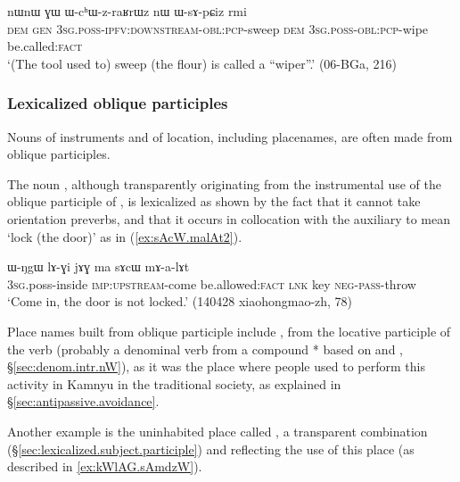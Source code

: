\begin{exe}
\ex \label{ex:WchWzraRWz}
\gll  nɯnɯ ɣɯ ɯ-cʰɯ-z-raʁrɯz nɯ ɯ-sɤ-pɕiz rmi \\ 
\textsc{dem} \textsc{gen} \textsc{3sg}.\textsc{poss}-\textsc{ipfv}:\textsc{downstream}-\textsc{obl}:\textsc{pcp}-sweep \textsc{dem}  \textsc{3sg}.\textsc{poss}-\textsc{obl}:\textsc{pcp}-wipe be.called:\textsc{fact} \\
\glt `(The tool used to) sweep (the flour) is called a ``wiper''.' (06-BGa, 216)
\end{exe}

\subsubsection{Lexicalized oblique participles} \label{sec:lexicalized.oblique.participle}
Nouns of instruments and of location, including placenames, are often made from oblique participles. 

The noun , although transparently originating from the instrumental use of the oblique participle of , is lexicalized as shown by the fact that it cannot take orientation preverbs, and that it occurs in collocation with the auxiliary  to mean `lock (the door)' as in (\ref{ex:sAcW.malAt2}).

\begin{exe}
\ex \label{ex:sAcW.malAt2}
\gll   ɯ-ŋgɯ lɤ-ɣi jɤɣ ma sɤcɯ mɤ-a-lɤt \\
\textsc{3sg}.poss-inside \textsc{imp}:\textsc{upstream}-come be.allowed:\textsc{fact} \textsc{lnk} key \textsc{neg}-\textsc{pass}-throw \\
\glt `Come in, the door is not locked.' (140428 xiaohongmao-zh, 78)
\end{exe}

Place names built from oblique participle include , from the locative participle  of the verb  (probably a denominal verb from a compound * based on  and , §\ref{sec:denom.intr.nW}), as it was the place where people used to perform this activity in Kamnyu in the traditional society, as explained in §\ref{sec:antipassive.avoidance}.
 
Another example is the uninhabited place called , a transparent combination   (§\ref{sec:lexicalized.subject.participle}) and  reflecting the use of this place (as described in \ref{ex:kWlAG.sAmdzW}).

